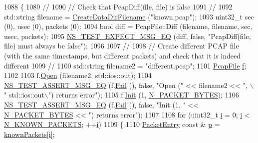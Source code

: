 \begin{DoxyCode}
1088 \{
1089   \textcolor{comment}{//}
1090   \textcolor{comment}{// Check that PcapDiff(file, file) is false}
1091   \textcolor{comment}{//}
1092   std::string filename = \hyperlink{classns3_1_1TestCase_a3e4d216ff392a43418f26bb3e5b0f16d}{CreateDataDirFilename} (\textcolor{stringliteral}{"known.pcap"});
1093   uint32\_t sec (0), usec (0), packets (0);
1094   \textcolor{keywordtype}{bool} diff = PcapFile::Diff (filename, filename, sec, usec, packets);
1095   \hyperlink{group__testing_ga7304ba46a28d8cf08dfdfd6499cf7068}{NS\_TEST\_EXPECT\_MSG\_EQ} (diff, \textcolor{keyword}{false}, \textcolor{stringliteral}{"PcapDiff(file, file) must always be false"});
1096 
1097   \textcolor{comment}{//}
1098   \textcolor{comment}{// Create different PCAP file (with the same timestamps, but different packets) and check that it is
       indeed different }
1099   \textcolor{comment}{//}
1100   std::string filename2 = \textcolor{stringliteral}{"different.pcap"};
1101   \hyperlink{classns3_1_1PcapFile}{PcapFile} \hyperlink{buildings__pathloss_8m_aa52d3a6e3de5a80a97c12364caeaa125}{f};
1102 
1103   f.\hyperlink{classns3_1_1PcapFile_a064e8494e28e823d0bb4e40549f9f483}{Open} (filename2, std::ios::out);
1104   \hyperlink{group__testing_ga2a9d78cffb3db8e867c35fff0b698cf5}{NS\_TEST\_ASSERT\_MSG\_EQ} (f.\hyperlink{classns3_1_1PcapFile_a2e00aa080890a0c9c3e9f5bd2d6c21d5}{Fail} (), \textcolor{keyword}{false}, \textcolor{stringliteral}{"Open ("} << filename2 << \textcolor{stringliteral}{", \(\backslash\)"
      std::ios::out\(\backslash\)") returns error"});
1105   f.\hyperlink{classns3_1_1PcapFile_a80c8adea1baa66e3f730df2927b0fc9b}{Init} (1, \hyperlink{pcap-file-test-suite_8cc_afbd70e37403299f8c72166deb34c04c3}{N\_PACKET\_BYTES});
1106   \hyperlink{group__testing_ga2a9d78cffb3db8e867c35fff0b698cf5}{NS\_TEST\_ASSERT\_MSG\_EQ} (f.\hyperlink{classns3_1_1PcapFile_a2e00aa080890a0c9c3e9f5bd2d6c21d5}{Fail} (), \textcolor{keyword}{false}, \textcolor{stringliteral}{"Init (1, "} << 
      \hyperlink{pcap-file-test-suite_8cc_afbd70e37403299f8c72166deb34c04c3}{N\_PACKET\_BYTES} << \textcolor{stringliteral}{") returns error"});
1107 
1108   \textcolor{keywordflow}{for} (uint32\_t \hyperlink{bernuolliDistribution_8m_a6f6ccfcf58b31cb6412107d9d5281426}{i} = 0; \hyperlink{bernuolliDistribution_8m_a6f6ccfcf58b31cb6412107d9d5281426}{i} < \hyperlink{pcap-file-test-suite_8cc_a368109b7271b955012621f214217cc55}{N\_KNOWN\_PACKETS}; ++\hyperlink{bernuolliDistribution_8m_a6f6ccfcf58b31cb6412107d9d5281426}{i})
1109     \{
1110       \hyperlink{structPACKET__ENTRY}{PacketEntry} \textcolor{keyword}{const} & \hyperlink{lte__link__budget_8m_ac9de518908a968428863f829398a4e62}{p} = \hyperlink{pcap-file-test-suite_8cc_acfb9111e8cf0f99feb122526fba2c98d}{knownPackets}[\hyperlink{bernuolliDistribution_8m_a6f6ccfcf58b31cb6412107d9d5281426}{i}];

\end{DoxyCode}
